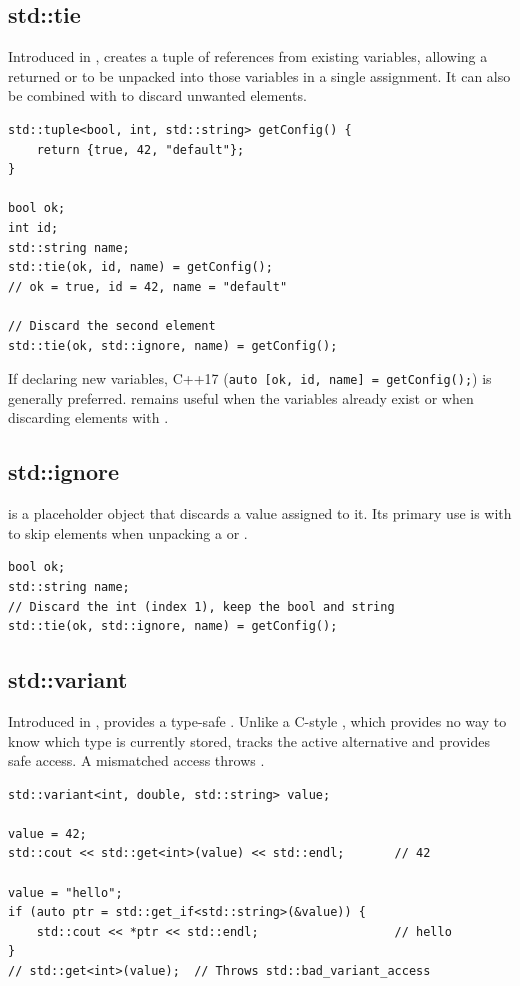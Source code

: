 \subsection{std::tie}
Introduced in ,  creates a tuple of references from existing variables, allowing a returned  or  to be unpacked into those variables in a single assignment. It can also be combined with  to discard unwanted elements.
\begin{lstlisting}
std::tuple<bool, int, std::string> getConfig() {
    return {true, 42, "default"};
}

bool ok;
int id;
std::string name;
std::tie(ok, id, name) = getConfig();
// ok = true, id = 42, name = "default"

// Discard the second element
std::tie(ok, std::ignore, name) = getConfig();
\end{lstlisting}
If declaring new variables, C++17  (\texttt{auto [ok, id, name] = getConfig();}) is generally preferred.  remains useful when the variables already exist or when discarding elements with .

\subsection{std::ignore}
 is a placeholder object that discards a value assigned to it. Its primary use is with  to skip elements when unpacking a  or .
\begin{lstlisting}
bool ok;
std::string name;
// Discard the int (index 1), keep the bool and string
std::tie(ok, std::ignore, name) = getConfig();
\end{lstlisting}

\subsection{std::variant}
Introduced in ,  provides a type-safe . Unlike a C-style , which provides no way to know which type is currently stored,  tracks the active alternative and provides safe access. A mismatched access throws .
\begin{lstlisting}
std::variant<int, double, std::string> value;

value = 42;
std::cout << std::get<int>(value) << std::endl;       // 42

value = "hello";
if (auto ptr = std::get_if<std::string>(&value)) {
    std::cout << *ptr << std::endl;                   // hello
}
// std::get<int>(value);  // Throws std::bad_variant_access
\end{lstlisting}

